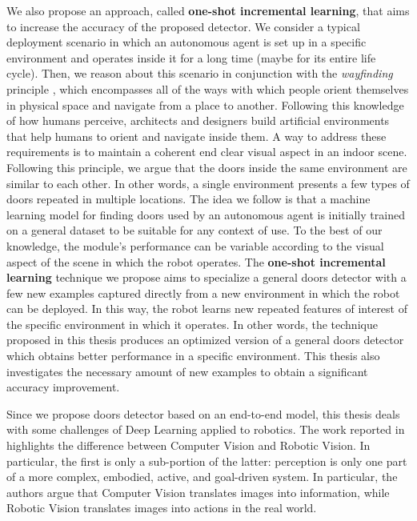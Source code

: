 We also propose an approach, called \textbf{one-shot incremental learning}, that aims to increase the accuracy of the proposed detector. We consider a typical deployment scenario in which an autonomous agent is set up in a specific environment and operates inside it for a long time (maybe for its entire life cycle). Then, we reason about this scenario in  conjunction with the \textit{wayfinding} principle \cite{wayfinding, imageofcity}, which encompasses all of the ways with which people orient themselves in physical space and navigate from a place to another. Following this knowledge of how humans perceive, architects and designers build artificial environments that help humans to orient and navigate inside them. A way to address these requirements is to maintain a coherent end clear visual aspect in an indoor scene. Following this principle, we argue that the doors inside the same environment are similar to each other. In other words, a single environment presents a few types of doors repeated in multiple locations. The idea we follow is that a machine learning model for finding doors used by an autonomous agent is initially trained on a general dataset to be suitable for any context of use. To the best of our knowledge, the module's performance can be variable according to the visual aspect of the scene in which the robot operates. The \textbf{one-shot incremental learning} technique we propose aims to specialize a general doors detector with a few new examples captured directly from a new environment in which the robot can be deployed. In this way, the robot learns new  repeated features of interest of the specific environment in which it operates. 
 In other words, the technique proposed in this thesis produces an optimized version of a general doors detector which obtains better performance in a specific environment. This thesis also investigates the necessary amount of new examples to obtain a significant accuracy improvement.

Since we propose doors detector based on an end-to-end model, this thesis deals with some challenges of Deep Learning applied to robotics. The work reported in \cite{surveydeeplimits} highlights the difference between Computer Vision and Robotic Vision. In particular, the first is only a sub-portion of the latter: perception is only one part of a more complex, embodied, active, and goal-driven system. In particular, the authors argue that Computer Vision translates images into information, while Robotic Vision translates images into actions in the real world.

